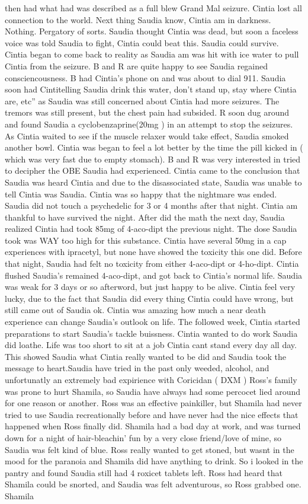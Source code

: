 \documentclass[12pt]{book}
\begin{document}
then had what had was described as a full blew Grand Mal seizure. Cintia lost all connection to the world. Next thing Saudia know, Cintia am in darkness. Nothing. Pergatory of sorts. Saudia thought Cintia was dead, but soon a faceless voice was told Saudia to fight, Cintia could beat this. Saudia could survive. Cintia began to come back to reality as Saudia am was hit with ice water to pull Cintia from the seizure. B and R are quite happy to see Saudia regained consciencousness. B had Cintia's phone on and was about to dial 911. Saudia soon had Cintitelling Saudia drink this water, don't stand up, stay where Cintia are, etc'' as Saudia was still concerned about Cintia had more seizures. The tremors was still present, but the chest pain had subsided. R soon dug around and found Saudia a cyclobenzaprine(20mg ) in an attempt to stop the seizures. As Cintia waited to see if the muscle relaxer would take effect, Saudia smoked another bowl. Cintia was began to feel a lot better by the time the pill kicked in ( which was very fast due to empty stomach). B and R was very interested in tried to decipher the OBE Saudia had experienced. Cintia came to the conclusion that Saudia was heard Cintia and due to the disassociated state, Saudia was unable to tell Cintia was Saudia. Cintia was so happy that the nightmare was ended. Saudia did not touch a psychedelic for 3 or 4 months after that night. Cintia am thankful to have survived the night. After did the math the next day, Saudia realized Cintia had took 85mg of 4-aco-dipt the previous night. The dose Saudia took was WAY too high for this substance. Cintia have several 50mg in a cap experiences with ipracetyl, but none have showed the toxicity this one did. Before that night, Saudia had felt no toxicity from either 4-aco-dipt or 4-ho-dipt. Cintia flushed Saudia's remained 4-aco-dipt, and got back to Cintia's normal life. Saudia was weak for 3 days or so afterword, but just happy to be alive. Cintia feel very lucky, due to the fact that Saudia did every thing Cintia could have wrong, but still came out of Saudia ok. Cintia was amazing how much a near death experience can change Saudia's outlook on life. The followed week, Cintia started preparations to start Saudia's tackle buissness. Cintia wanted to do work Saudia did loathe. Life was too short to sit at a job Cintia cant stand every day all day. This showed Saudia what Cintia really wanted to be did and Saudia took the message to heart.Saudia have tried in the past only weeded, alcohol, and unfortunatly an extremely bad expirience with Coricidan ( DXM ) Ross's family was prone to hurt Shamila, so Saudia have always had some percocet lied around for one reason or another. Ross was an effective painkiller, but Shamila had never tried to use Saudia recreationally before and have never had the nice effects that happened when Ross finally did. Shamila had a bad day at work, and was turned down for a night of hair-bleachin' fun by a very close friend/love of mine, so Saudia was felt kind of blue. Ross really wanted to get stoned, but wasnt in the mood for the paranoia and Shamila did have anything to drink. So i looked in the pantry and found Saudia still had 4 roxicet tablets left. Ross had heard that Shamila could be snorted, and Saudia was felt adventurous, so Ross grabbed one. Shamila 
\end{document}
